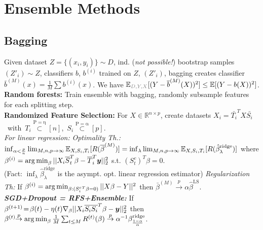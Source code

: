\section*{Ensemble Methods}
\subsection*{Bagging}
Given dataset $Z =\{(x_i,y_i)\}\sim D$, ind. (\emph{not possible!}) bootstrap samples $(Z'_i) \sim Z$, classifiers $b$, $b^{(i)}$ trained on $Z$, $(Z'_i)$, bagging creates classifier $\bar{b}^{(M)}(x) = \frac{1}{M}\sum b^{(i)}(x)$. We have $\E_{\color{gray}D,Y,X}[(Y-\bar{b}^{(M)}(X))^2] \leq \E[(Y-b(X))^2]$.\\
\textbf{Random forests:} Train ensemble with bagging, randomly subsample features for each splitting step.\\
\textbf{Randomized Feature Selection:} For $X\in\mathbb{R}^{n\times p}$, create datasets \mbox{$X_i = \bar{T_i}^TX\bar{S_i}$ with $T_i \overset{\mathrm{P= \eta}}{\subset} [n]$, $S_i \overset{\mathrm{P=\alpha}}{\subset} [p]$.}\\
\emph{For linear regression:}
\emph{Optimality Th.:} $\inf_{\alpha<\frac{p}{n}}\lim_{M,n,p\to\infty}\mathbb{E}_{X,S_i,T_i}[R(\overline{\beta}^{(M)})] = \inf_{\lambda}\lim_{M,n,p\to\infty}\mathbb{E}_{X,S_i,T_i}[R(\hat{\beta}_{\lambda}^{\mathrm{ridge}})]$  where $\beta^{(i)} = \operatorname*{arg\,min}_\beta ||X_i\overline{S}_t^T\beta - \overline{T}_i^T{\bm{y}}||^2_2$ s.t. $(S^c_t)^T\beta=0$.\\ (Fact: $\inf_{\lambda}\hat{\beta}_{\lambda}^{\mathrm{ridge}}$ is the asympt. opt. linear regression estimator)
\emph{Regularization Th:} If $\beta^{(i)}=\operatorname*{arg\,min}_{\beta:({S_i^c}^T\beta=0)}||X\beta-Y||^2$ then $\bar{\beta}^{(M)}\overset{p}{\to}\alpha\hat{\beta}^{\mathrm{LS}}$.\\
\emph{\textbf{SGD+Dropout = RFS+Ensemble:}} \mbox{If $\beta^{(t+1)}\!=\!\beta{(t)}-\eta(t)\nabla_\beta||X_i\overline{S_i}\overline{S_i}^T\beta - {\bm{y}}||^2_2$} then $\beta^{(t)}\!
\!\overset{p}{\to}\operatorname*{arg\,min}_\beta \frac{1}{M}\sum_{t\leq M}R^{(t)}(\beta)\overset{p}{\to}\alpha^{-1}\beta^{\mathrm{ridge}}_{\frac{1-\alpha}{\alpha}}$.

